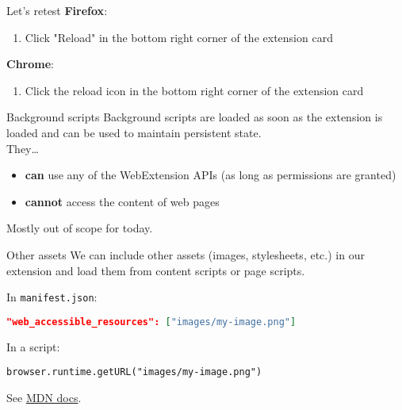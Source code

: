 \documentclass[../index.tex]{subfiles}
\begin{document}
\renewcommand{\currenttitle}{Let's retest}
\begin{frame}{\currenttitle}
  \textbf{Firefox}:
  \begin{enumerate}
    \item Click "Reload" in the bottom right corner of the extension card
  \end{enumerate}

  \textbf{Chrome}:
  \begin{enumerate}
    \item Click the reload icon in the bottom right corner of the extension
          card
  \end{enumerate}
\end{frame}

\renewcommand{\currenttitle}{Background scripts}
\begin{frame}{\currenttitle}
  Background scripts are loaded as soon as the extension is loaded and can be
  used to maintain persistent state. \\[1em]

  They\dots
  \begin{itemize}
    \item \textbf{can} use any of the WebExtension APIs (as long as permissions
          are granted)
    \item \textbf{cannot} access the content of web pages
  \end{itemize}

  Mostly out of scope for today.
\end{frame}

\renewcommand{\currenttitle}{Other assets}
\begin{frame}[fragile]{\currenttitle}
  We can include other assets (images, stylesheets, etc.) in our extension and
  load them from content scripts or page scripts.

  In \texttt{manifest.json}:
  \begin{lstlisting}[language=json]
    "web_accessible_resources": ["images/my-image.png"]
  \end{lstlisting}

  In a script:
  \begin{lstlisting}[language=ES6]
    browser.runtime.getURL("images/my-image.png")
  \end{lstlisting}

  See \href{https://developer.mozilla.org/en-US/docs/Mozilla/Add-ons/WebExtensions/manifest.json/web_accessible_resources}{MDN docs}.
\end{frame}

\end{document}
